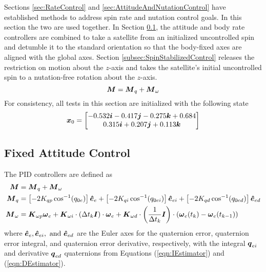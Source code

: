 Sections \ref{sec:RateControl} and \ref{sec:AttitudeAndNutationControl} have established methods to address spin rate and nutation control goals.  In this section the two are used together.  In Section \ref{subsec:FixedAttitudeControl}, the attitude and body rate controllers are combined to take a satellite from an initialized uncontrolled spin and detumble it to the standard orientation so that the body-fixed axes are aligned with the global axes.  Section \ref{subsec:SpinStabilizedControl} releases the restriction on motion about the $z$-axis and takes the satellite's initial uncontrolled spin to a nutation-free rotation about the $z$-axis.
\begin{equation}
    \boldsymbol{M} = \boldsymbol{M}_{q} + \boldsymbol{M}_{\omega}
\end{equation}
For consistency, all tests in this section are initialized with the following state
\begin{equation}
  \boldsymbol{x}_0 = \begin{bmatrix} -0.532 \boldsymbol{i} -0.417 \boldsymbol{j} -0.275 \boldsymbol{k} +0.684 \\ 0.315 \boldsymbol{i} +0.207 \boldsymbol{j} +0.113 \boldsymbol{k} \end{bmatrix}
  \label{eqn:attitude_and_body_rate_control_ic}
\end{equation}

\subsection{Fixed Attitude Control}
\label{subsec:FixedAttitudeControl}
The PID controllers are defined as
\begin{equation}
  \begin{aligned}
    \boldsymbol{M} &= \boldsymbol{M}_{q} + \boldsymbol{M}_{\omega} \\
    \boldsymbol{M}_{q} &= \left[- 2K_{qp} \cos^{-1} (q_{0e}) \right] \boldsymbol{\hat{e}}_e + \left[- 2K_{qi} \cos^{-1} (q_{0ei}) \right] \boldsymbol{\hat{e}}_{ei} + \left[- 2K_{qd} \cos^{-1} (q_{0ed}) \right] \boldsymbol{\hat{e}}_{ed} \\
    \boldsymbol{M}_{\omega} &= \boldsymbol{K}_{\omega p} \boldsymbol{\omega}_e + \boldsymbol{K}_{\omega i} \cdot (\Delta t_k \boldsymbol{I})\cdot \boldsymbol{\omega}_e + \boldsymbol{K}_{\omega d} \cdot \left(\frac{1}{\Delta t_k} \boldsymbol{I}\right) \cdot (\boldsymbol{\omega}_e(t_k) - \boldsymbol{\omega}_e(t_{k-1}))
  \end{aligned}
\end{equation}
where $\boldsymbol{\hat{e}}_e, \boldsymbol{\hat{e}}_{ei}, \text{ and } \boldsymbol{\hat{e}}_{ed}$ are the Euler axes for the quaternion error, quaternion error integral, and quaternion error derivative, respectively, with the integral $\boldsymbol{q}_{ei}$ and derivative $\boldsymbol{q}_{ed}$ quaternions from Equations (\ref{eqn:IEstimator}) and (\ref{eqn:DEstimator}).

